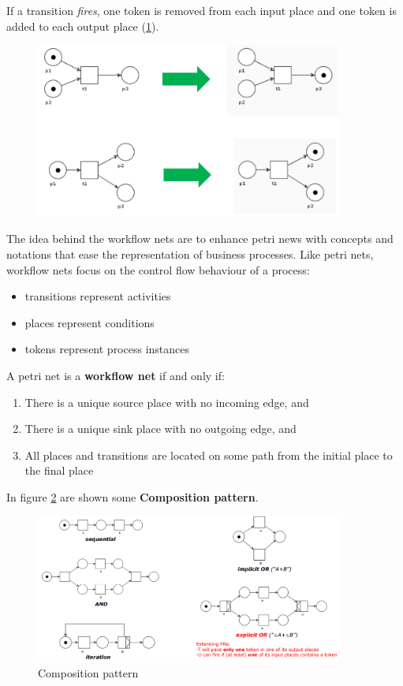 \documentclass[10pt,a4paper]{report}
\begin{document}
If a transition \textit{fires}, one token is removed from each input place and one token is added to each output place (\ref{image80}).
\begin{figure}[h]
	\centering
	\includegraphics[width=0.9\textwidth]{image80}
	\caption{}
	\label{image80}
\end{figure}
The idea behind the workflow nets are to enhance petri news with concepts and notations that ease the representation of business processes. Like petri nets, workflow nets focus on the control flow behaviour of a process:
\begin{itemize}
	\item transitions represent activities
	\item places represent conditions
	\item tokens represent process instances
\end{itemize}
A petri net is a \textbf{workflow net} if and only if:
\begin{enumerate}
	\item There is a unique source place with no incoming edge, and
	\item There is a unique sink place with no outgoing edge, and
	\item All places and transitions are located on some path from
	the initial place to the final place
\end{enumerate}
In figure \ref{image81} are shown some \textbf{Composition pattern}.
\begin{figure}[h]
	\centering
	\includegraphics[width=0.9\textwidth]{image81}
	\caption{Composition pattern}
	\label{image81}
\end{figure}
\end{document}
